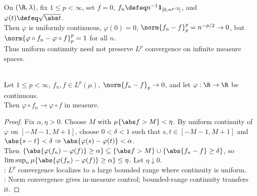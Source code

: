 \begin{example} \label{ex:uniform-continuity-composition-lp-needs-finite-measure} \\
On $(\R,\lambda)$, fix $1\leq p<\infty$, set $f=0$, $f_n\defeq n^{-1}\mathbf{1}_{[0,n^{p/2}]}$, and $\varphi(t)\defeq\sqrt{\abs t}$.\\
Then $\varphi$ is uniformly continuous, $\varphi(0)=0$, $\norm{f_n-f}_p^p=n^{-p/2}\to0$, but $\norm{\varphi\circ f_n-\varphi\circ f}_p^p=1$ for all $n$.\\
Thus uniform continuity need not preserve $L^p$ convergence on infinite measure spaces.
\end{example}

\begin{lemma} \label{lem:lp-convergence-continuous-composition-in-measure} \\
Let $1\leq p<\infty$, $f_n,f\in L^p(\mu)$, $\norm{f_n-f}_p\to0$, and let $\varphi:\R\to\R$ be continuous.\\
Then $\varphi\circ f_n\to\varphi\circ f$ in measure.
\begin{proof}
Fix $\alpha,\eta>0$. Choose $M$ with $\mu\{\abs f>M\}<\eta$. By uniform continuity of $\varphi$ on $[-M-1,M+1]$, choose $0<\delta<1$ such that $s,t\in[-M-1,M+1]$ and $\abs{s-t}<\delta\Rightarrow\abs{\varphi(s)-\varphi(t)}<\alpha$.\\
Then $\{\abs{\varphi(f_n)-\varphi(f)}\geq\alpha\}\subseteq\{\abs f>M\}\cup\{\abs{f_n-f}\geq\delta\}$, so $\limsup_n\mu\{\abs{\varphi(f_n)-\varphi(f)}\geq\alpha\}\leq\eta$. Let $\eta\downarrow0$.\\
: $L^p$ convergence localizes to a large bounded range where continuity is uniform.\\
: Norm convergence gives in-measure control; bounded-range continuity transfers it.
\end{proof}
\end{lemma}

